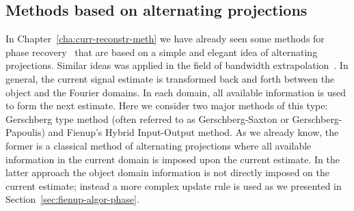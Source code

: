 \subsection{Methods based on alternating projections}
\label{sec:meth-base-altern}
In Chapter~\ref{cha:curr-reconstr-meth} we have already seen some methods for phase
recovery~ that are based
on a simple and elegant idea of alternating projections. Similar ideas
was applied in the field of bandwidth
extrapolation~.
In general, the current
signal estimate is transformed back and forth between the object and
the Fourier domains. In each domain, all available information is used
to form the next estimate. Here we consider two major methods of this
type: Gerschberg type method (often referred to as Gerschberg-Saxton
or Gerschberg-Papoulis) and Fienup's Hybrid Input-Output method. As we
already know, the
former is a classical method of alternating projections where all
available information in the current domain is imposed upon the
current estimate. In the latter approach the object domain
information is not directly imposed on the current estimate; instead a
more complex update rule is used as we presented in
Section~\ref{sec:fienup-algor-phase}. 

